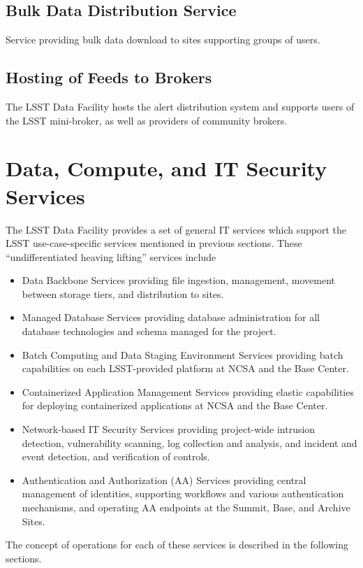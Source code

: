 \subsection{Bulk Data Distribution Service}
Service providing bulk data download to sites supporting groups of users.
%

\subsection{Hosting of Feeds to Brokers}
The LSST Data Facility hosts the alert distribution system and supports users of 
the LSST mini-broker, as well as providers of community brokers.
% 

\section{Data, Compute, and IT Security Services}
The LSST Data Facility provides a set of general IT services which support the 
LSST use-case-specific services mentioned in previous sections. These 
``undifferentiated heaving lifting'' services include

\begin{itemize}
\item Data Backbone Services providing file ingestion, management, movement 
between storage tiers, and distribution to sites.
\item Managed Database Services providing database administration for all 
database technologies and schema managed for the project.
\item Batch Computing and Data Staging Environment Services providing batch 
capabilities on each LSST-provided platform at NCSA and the Base Center. 
\item Containerized Application Management Services providing elastic 
capabilities for deploying containerized applications at NCSA and the Base Center.
\item Network-based IT Security Services providing project-wide intrusion 
detection, vulnerability scanning, log collection and analysis, and incident and 
event detection, and verification of controls.
\item Authentication and Authorization (AA) Services providing central management of
identities, supporting workflows and various authentication mechanisms, and 
operating AA endpoints at the Summit, Base, and Archive Sites.
\end{itemize}

The concept of operations for each of these services is described in the 
following sections.

